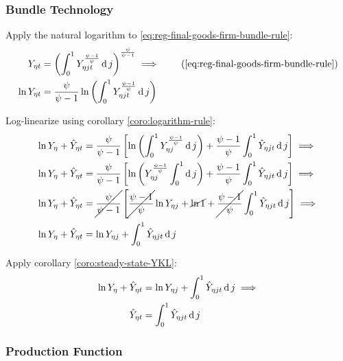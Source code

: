 \documentclass[
thesis.tex
]{subfiles}
\begin{document}

	\subsubsection*{Bundle Technology}

Apply the natural logarithm to \ref{eq:reg-final-goods-firm-bundle-rule}:
\begin{align}
	Y_{\eta t} &= \left( \int_{0}^{1} Y_{\eta jt}^{\frac{\psi-1}{\psi}} \dif j \right)^{\frac{\psi}{\psi-1}} \implies  \tag{\ref{eq:reg-final-goods-firm-bundle-rule}} \\
	\ln{Y_{\eta t}} &= {\frac{\psi}{\psi-1}} \ln{\left( \int_{0}^{1} Y_{\eta jt}^{\frac{\psi-1}{\psi}} \dif j \right)} \nonumber
\end{align}

Log-linearize using corollary \ref{coro:logarithm-rule}:
\begin{align}
	\ln{Y_{\eta}} + \hat{Y}_{\eta t} &= \frac{\psi}{\psi-1} \left[ \ln \left( \int_{0}^{1} Y_{\eta j}^{\frac{\psi-1}{\psi}} \operatorname{d} j \right) + \frac{\psi-1}{\psi} \int_{0}^{1} \hat{Y}_{\eta jt} \operatorname{d} j \right] \implies \nonumber
	\\
	\ln{Y_{\eta}} + \hat{Y}_{\eta t} &= \frac{\psi}{\psi-1} \left[ \ln \left( Y_{\eta j}^{\frac{\psi-1}{\psi}} \int_{0}^{1} \operatorname{d} j \right) + \frac{\psi-1}{\psi} \int_{0}^{1} \hat{Y}_{\eta jt} \operatorname{d} j \right] \implies \nonumber
	\\
	\ln{Y_{\eta}} + \hat{Y}_{\eta t} &= \cancel{\frac{\psi}{\psi-1}} \left[ \cancel{\frac{\psi-1}{\psi}} \ln{Y_{\eta j}} + \cancel{\ln1} + \cancel{\frac{\psi-1}{\psi}} \int_{0}^{1} \hat{Y}_{\eta jt} \operatorname{d} j \right] \implies \nonumber
	\\
	\ln{Y_{\eta}} + \hat{Y}_{\eta t} &= \ln{Y_{\eta j}} + \int_{0}^{1} \hat{Y}_{\eta jt} \operatorname{d} j \nonumber
\end{align}

Apply corollary \ref{coro:steady-state-YKL}:
\begin{align}
	\ln{Y_{\eta}} + \hat{Y}_{\eta t} &= \ln{Y_{\eta j}} + \int_{0}^{1} \hat{Y}_{\eta jt} \operatorname{d} j \implies \nonumber \\
	\hat{Y}_{\eta t} &= \int_{0}^{1} \hat{Y}_{\eta jt} \operatorname{d} j 
	\label{eq:reg-ll-final-goods-firm-bundle-rule}
\end{align}


\subsubsection*{Production Function}
\end{document}
